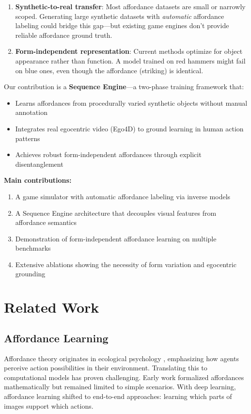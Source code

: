 \documentclass[11pt]{article}
\begin{document}
\begin{enumerate}
    \item \textbf{Synthetic-to-real transfer}: Most affordance datasets are small or narrowly scoped. Generating large synthetic datasets with \textit{automatic} affordance labeling could bridge this gap—but existing game engines don't provide reliable affordance ground truth.
    
    \item \textbf{Form-independent representation}: Current methods optimize for object appearance rather than function. A model trained on red hammers might fail on blue ones, even though the affordance (striking) is identical.
\end{enumerate}

Our contribution is a \textbf{Sequence Engine}—a two-phase training framework that:
\begin{itemize}
    \item Learns affordances from procedurally varied synthetic objects without manual annotation
    \item Integrates real egocentric video (Ego4D) to ground learning in human action patterns
    \item Achieves robust form-independent affordances through explicit disentanglement
\end{itemize}

\textbf{Main contributions:}
\begin{enumerate}
    \item A game simulator with automatic affordance labeling via inverse models
    \item A Sequence Engine architecture that decouples visual features from affordance semantics
    \item Demonstration of form-independent affordance learning on multiple benchmarks
    \item Extensive ablations showing the necessity of form variation and egocentric grounding
\end{enumerate}

\section{Related Work}

\subsection{Affordance Learning}

Affordance theory originates in ecological psychology \cite{gibson1977ecological}, emphasizing how agents perceive action possibilities in their environment. Translating this to computational models has proven challenging. Early work \cite{turvey1992affordances, bingham1995computational} formalized affordances mathematically but remained limited to simple scenarios. With deep learning, affordance learning shifted to end-to-end approaches: learning which parts of images support which actions.
\end{document}
